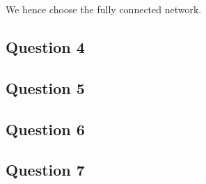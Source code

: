 \documentclass[12pt,a4paper,fleqn]{article}
\begin{document}
We hence choose the fully connected network.

\subsection*{Question 4}
\label{sec:pq4}

\subsection*{Question 5}
\label{sec:pq5}

\subsection*{Question 6}
\label{sec:pq6}

\subsection*{Question 7}
\label{sec:pq7}
 
\begin{thebibliography}{1}

\end{thebibliography}
\end{document}
